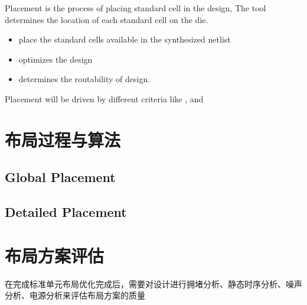 \documentclass[letterpaper,10pt,english]{sphinxmanual}
\begin{document}
\begin{figure}[htbp]
\centering

\noindent{}
\end{figure}

\sphinxAtStartPar
Placement is the process of placing standard cell in the design, The tool determines the location of each standard cell on the die.
\begin{itemize}
\item {} 
\sphinxAtStartPar
place the standard cells available in the synthesized netlist

\item {} 
\sphinxAtStartPar
optimizes the design

\item {} 
\sphinxAtStartPar
determines the routability of design.

\end{itemize}

\sphinxAtStartPar
Placement will be driven by different criteria like  ,   and  


\section{布局过程与算法}
\label{\detokenize{chapter6/_u5e03_u5c40_u8fc7_u7a0b_u4e0e_u7b97_u6cd5:id1}}\label{\detokenize{chapter6/_u5e03_u5c40_u8fc7_u7a0b_u4e0e_u7b97_u6cd5::doc}}

\subsection{Global Placement}
\label{\detokenize{chapter6/_u5e03_u5c40_u8fc7_u7a0b_u4e0e_u7b97_u6cd5:global-placement}}

\subsection{Detailed Placement}
\label{\detokenize{chapter6/_u5e03_u5c40_u8fc7_u7a0b_u4e0e_u7b97_u6cd5:detailed-placement}}

\section{布局方案评估}
\label{\detokenize{chapter6/_u5e03_u5c40_u65b9_u6848_u8bc4_u4f30:id1}}\label{\detokenize{chapter6/_u5e03_u5c40_u65b9_u6848_u8bc4_u4f30::doc}}
\sphinxAtStartPar
在完成标准单元布局优化完成后，需要对设计进行拥堵分析、静态时序分析、噪声分析、电源分析来评估布局方案的质量
\end{document}
